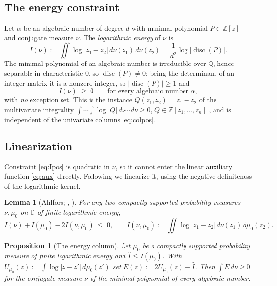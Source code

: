 \documentclass[11pt,reqno]{amsart}
\theoremstyle{plain}
\newtheorem{proposition}[theorem]{Proposition}
\newtheorem{lemma}[theorem]{Lemma}
\theoremstyle{definition}
\newcommand{\Q}{\mathbb{Q}}
\newcommand{\Z}{\mathbb{Z}}
\newcommand{\C}{\mathbb{C}}
\newcommand{\disc}{\operatorname{disc}}
\newcommand{\Ihat}{\widehat{I}}
\begin{document}
\subsection{The energy constraint}
Let $\alpha$ be an algebraic number of degree $d$ with minimal polynomial $P\in\Z[z]$
and conjugate measure $\nu$. The \emph{logarithmic energy} of $\nu$ is
\begin{equation}\label{eq:Inu}
  I(\nu):=\iint\log|z_1-z_2|\,d\nu(z_1)\,d\nu(z_2)=\frac1{d^2}\log\bigl|\disc(P)\bigr|.
\end{equation}
The minimal polynomial of an algebraic number is irreducible over $\Q$, hence
separable in characteristic $0$, so $\disc(P)\neq0$; being the determinant of an
integer matrix it is a nonzero integer, so $|\disc(P)|\ge1$ and
\begin{equation}\label{eq:Ipos}
  I(\nu)\;\ge\;0\qquad\text{for every algebraic number }\alpha,
\end{equation}
with \emph{no} exception set. This is the instance $Q(z_1,z_2)=z_1-z_2$ of the
multivariate integrality $\int\!\cdots\!\int\log|Q|\,d\nu\cdots d\nu\ge0$,
$Q\in\Z[z_1,\dots,z_n]$ \citep{OSS,OT23}, and is independent of the univariate
columns \eqref{eq:colpos}.

\subsection{Linearization}
Constraint \eqref{eq:Ipos} is quadratic in $\nu$, so it cannot enter the linear
auxiliary function \eqref{eq:aux} directly. Following \citet[eq.~(8)]{OSS} we linearize
it, using the negative-definiteness of the logarithmic kernel.

\begin{lemma}[Ahlfors; {\citealp[Lem.~2.1]{Ahl10}}, {\citealp[eq.~(6)]{OSS}}]
\label{lem:nsd}
For any two compactly supported probability measures $\nu,\mu_0$ on $\C$ of finite
logarithmic energy,
\begin{equation}\label{eq:nsd}
  I(\nu)+I(\mu_0)-2I(\nu,\mu_0)\;\le\;0,\qquad
  I(\nu,\mu_0):=\iint\log|z_1-z_2|\,d\nu(z_1)\,d\mu_0(z_2).
\end{equation}
\end{lemma}

\begin{proposition}[The energy column]\label{prop:energy}
Let $\mu_0$ be a compactly supported probability measure of finite logarithmic energy
and $\Ihat\le I(\mu_0)$. With $U_{\mu_0}(z):=\int\log|z-z'|\,d\mu_0(z')$ set
$E(z):=2U_{\mu_0}(z)-\Ihat$. Then $\int E\,d\nu\ge0$ for the conjugate measure $\nu$
of the minimal polynomial of every algebraic number.
\end{proposition}
\end{document}
